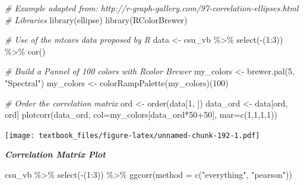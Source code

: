 \documentclass[
  11pt,
]{book}
\newenvironment{Shaded}{\begin{snugshade}}{\end{snugshade}}
\newcommand{\AttributeTok}[1]{\textcolor[rgb]{0.77,0.63,0.00}{#1}}
\newcommand{\CommentTok}[1]{\textcolor[rgb]{0.56,0.35,0.01}{\textit{#1}}}
\newcommand{\DecValTok}[1]{\textcolor[rgb]{0.00,0.00,0.81}{#1}}
\newcommand{\FunctionTok}[1]{\textcolor[rgb]{0.00,0.00,0.00}{#1}}
\newcommand{\NormalTok}[1]{#1}
\newcommand{\OtherTok}[1]{\textcolor[rgb]{0.56,0.35,0.01}{#1}}
\newcommand{\SpecialCharTok}[1]{\textcolor[rgb]{0.00,0.00,0.00}{#1}}
\newcommand{\StringTok}[1]{\textcolor[rgb]{0.31,0.60,0.02}{#1}}
\theoremstyle{definition}
\theoremstyle{definition}
\theoremstyle{definition}
\theoremstyle{definition}
\theoremstyle{remark}
\begin{document}
\begin{Shaded}
\begin{Highlighting}[]
\CommentTok{\# Example adapted from: http://r{-}graph{-}gallery.com/97{-}correlation{-}ellipses.html}
\CommentTok{\# Libraries}
\FunctionTok{library}\NormalTok{(ellipse)}
\FunctionTok{library}\NormalTok{(RColorBrewer)}

\CommentTok{\# Use of the mtcars data proposed by R}
\NormalTok{data }\OtherTok{\textless{}{-}}\NormalTok{ csu\_vb }\SpecialCharTok{\%\textgreater{}\%} \FunctionTok{select}\NormalTok{(}\SpecialCharTok{{-}}\NormalTok{(}\DecValTok{1}\SpecialCharTok{:}\DecValTok{3}\NormalTok{)) }\SpecialCharTok{\%\textgreater{}\%} \FunctionTok{cor}\NormalTok{()}

\CommentTok{\# Build a Pannel of 100 colors with Rcolor Brewer}
\NormalTok{my\_colors }\OtherTok{\textless{}{-}} \FunctionTok{brewer.pal}\NormalTok{(}\DecValTok{5}\NormalTok{, }\StringTok{"Spectral"}\NormalTok{)}
\NormalTok{my\_colors }\OtherTok{\textless{}{-}} \FunctionTok{colorRampPalette}\NormalTok{(my\_colors)(}\DecValTok{100}\NormalTok{)}

\CommentTok{\# Order the correlation matrix}
\NormalTok{ord }\OtherTok{\textless{}{-}} \FunctionTok{order}\NormalTok{(data[}\DecValTok{1}\NormalTok{, ])}
\NormalTok{data\_ord }\OtherTok{\textless{}{-}}\NormalTok{ data[ord, ord]}
\FunctionTok{plotcorr}\NormalTok{(data\_ord, }\AttributeTok{col=}\NormalTok{my\_colors[data\_ord}\SpecialCharTok{*}\DecValTok{50}\SpecialCharTok{+}\DecValTok{50}\NormalTok{], }\AttributeTok{mar=}\FunctionTok{c}\NormalTok{(}\DecValTok{1}\NormalTok{,}\DecValTok{1}\NormalTok{,}\DecValTok{1}\NormalTok{,}\DecValTok{1}\NormalTok{))}
\end{Highlighting}
\end{Shaded}

\texttt{[image: textbook\_files/figure-latex/unnamed-chunk-192-1.pdf]}

\newpage

\textbf{\emph{Correlation Matrix Plot}}

\begin{Shaded}
\begin{Highlighting}[]
\NormalTok{csu\_vb }\SpecialCharTok{\%\textgreater{}\%} \FunctionTok{select}\NormalTok{(}\SpecialCharTok{{-}}\NormalTok{(}\DecValTok{1}\SpecialCharTok{:}\DecValTok{3}\NormalTok{)) }\SpecialCharTok{\%\textgreater{}\%} 
  \FunctionTok{ggcorr}\NormalTok{(}\AttributeTok{method =} \FunctionTok{c}\NormalTok{(}\StringTok{"everything"}\NormalTok{, }\StringTok{"pearson"}\NormalTok{))}
\end{Highlighting}
\end{Shaded}
\end{document}
